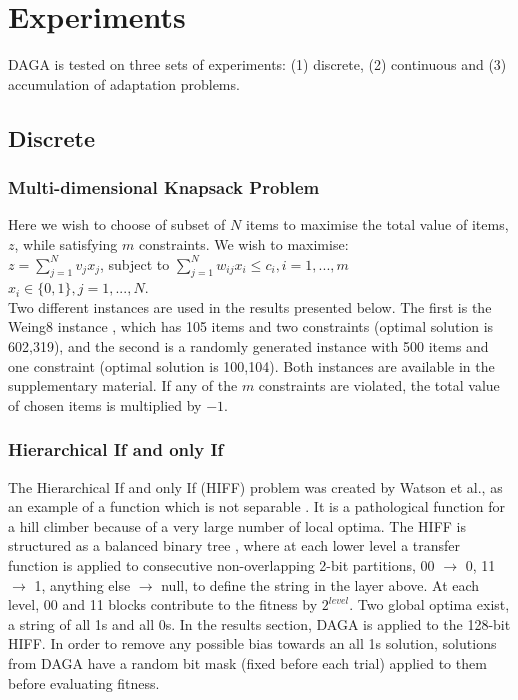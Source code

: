 \documentclass[runningheads,a4paper]{llncs}
\begin{document}
\section{Experiments}
\label{sec:experiments}
DAGA is tested on three sets of experiments: (1) discrete, (2) continuous and (3) accumulation of adaptation problems. 

\subsection{Discrete}
\subsubsection{Multi-dimensional Knapsack Problem}
Here we wish to choose of subset of \(N\) items to maximise the total value of items, \(z\), while satisfying \(m\) constraints. We wish to maximise:
\vspace{2mm}\\
\(z = \sum_{j=1}^{N} v_jx_j\), subject to \(\sum_{j=1}^{N} w_{ij}x_i \leq c_i, i = 1, ..., m\)
\vspace{2mm}\\
\(x_i \in \{0,1\}, j = 1, ..., N\).
\vspace{2mm}\\
Two different instances are used in the results presented below. The first is the Weing8 instance \cite{ref}, which has 105 items and two constraints (optimal solution is 602,319), and the second is a randomly generated instance with 500 items and one constraint (optimal solution is 100,104). Both instances are available in the supplementary material. If any of the \(m\) constraints are violated, the total value of chosen items is multiplied by \(-1\).

\subsubsection{Hierarchical If and only If}

The Hierarchical If and only If (HIFF) problem was created by Watson et al., as an example of a function which is not separable \cite{ref}. It is a pathological function for a hill climber because of a very large number of local optima. The HIFF is structured as a balanced binary tree \cite{hboa}, where at each lower level a transfer function is applied to consecutive non-overlapping 2-bit partitions, 00 \(\rightarrow\) 0, 11 \(\rightarrow\) 1, anything else \(\rightarrow\) null, to define the string in the layer above. At each level, 00 and 11 blocks contribute to the fitness by \(2^{level}\). Two global optima exist, a string of all 1s and all 0s. In the results section, DAGA is applied to the 128-bit HIFF. In order to remove any possible bias towards an all 1s solution, solutions from DAGA have a random bit mask (fixed before each trial) applied to them before evaluating fitness.
\end{document}
